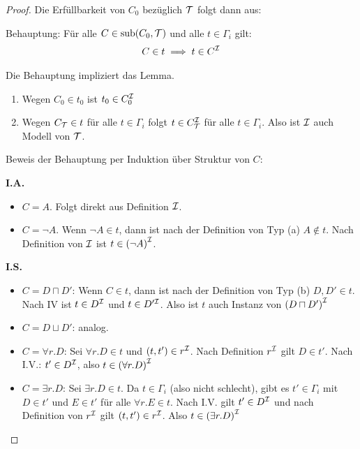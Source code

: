 \begin{proof}
Die Erfüllbarkeit von $C_0$ bezüglich $\mathcal{T}$ folgt dann aus:

Behauptung: Für alle $C \in \operatorname{sub}(C_0, \mathcal{T})$ und alle $t \in \Gamma_i$ gilt:
\begin{align*}
    C \in t \implies t \in C^{\mathcal{I}}
\end{align*}

\begin{tafel}[name=Beweis der Behauptung, continues=t:example51]
    Die Behauptung impliziert das Lemma.
    \begin{enumerate}
        \item Wegen $C_0 \in t_0$ ist $t_0 \in C_0^{\mathcal{I}}$
        \item Wegen $C_{\mathcal{T}} \in t$ für alle $t \in \Gamma_i$ folgt $t \in C_{\mathcal{T}}^{\mathcal{I}}$ für alle $t \in \Gamma_i$. Also ist $\mathcal{I}$ auch Modell von $\mathcal{T}$.
    \end{enumerate}
    Beweis der Behauptung per Induktion über Struktur von $C$:

\textbf{I.A.}
\begin{itemize}
    \item $C = A$. Folgt direkt aus Definition $\mathcal{I}$.
    \item $C = \neg A$. Wenn $\neg A \in t$, dann ist nach der Definition von Typ (a) $A \notin t$. Nach Definition von $\mathcal{I}$ ist $t \in {(\neg A)}^{\mathcal{I}}$.
\end{itemize}
\textbf{I.S.}
\begin{itemize}
    \item $C = D \sqcap D'$: Wenn $C \in t$, dann ist nach der Definition von  Typ (b) $D, D' \in t$. Nach IV ist $t \in D^{\mathcal{I}}$ und $t \in D'^{\mathcal{I}}$. Also ist $t$ auch Instanz von ${(D \sqcap D')}^{\mathcal{I}}$
    \item $C = D \sqcup D'$: analog.

\item $C = \forall r.D$:
Sei $\forall r.D \in t$ und $\left( t,t' \right) \in r^\MI$. Nach
Definition $r^{\mathcal{I}}$ gilt $D \in t'$. Nach I.V.:
$t' \in D^{\mathcal{I}}$, also $t \in {( \forall r.D )}^{\mathcal{I}}$

\item $C = \exists r.D$:
Sei $\exists r.D \in t$. Da $t \in \Gamma_{i}$ (also nicht
schlecht), gibt es $t' \in \Gamma_{i}$ mit $D \in t'$ und
$E \in t'$ für alle $\forall r.E \in t$. Nach I.V. gilt
$t' \in D^{\mathcal{I}}$ und nach Definition von $r^{\mathcal{I}}$ gilt
$\left( t,t' \right) \in r^\MI$. Also
$t \in {(\exists r.D )}^{\mathcal{I}}$
\end{itemize}
\end{tafel}
\end{proof}


